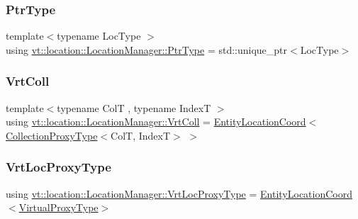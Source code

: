 \mbox{\label{structvt_1_1location_1_1_location_manager_a32d8bca6ed6909a2190286408335d3b4}} 
\subsubsection{\texorpdfstring{Ptr\+Type}{PtrType}}
{\footnotesize\ttfamily template$<$typename Loc\+Type $>$ \\
using \hyperlink{structvt_1_1location_1_1_location_manager_a32d8bca6ed6909a2190286408335d3b4}{vt\+::location\+::\+Location\+Manager\+::\+Ptr\+Type} =  std\+::unique\+\_\+ptr$<$Loc\+Type$>$}

\mbox{\label{structvt_1_1location_1_1_location_manager_a189fc3b436520c19aada9623a6b4a42e}} 
\subsubsection{\texorpdfstring{Vrt\+Coll}{VrtColl}}
{\footnotesize\ttfamily template$<$typename ColT , typename IndexT $>$ \\
using \hyperlink{structvt_1_1location_1_1_location_manager_a189fc3b436520c19aada9623a6b4a42e}{vt\+::location\+::\+Location\+Manager\+::\+Vrt\+Coll} =  \hyperlink{structvt_1_1location_1_1_entity_location_coord}{Entity\+Location\+Coord}$<$\hyperlink{structvt_1_1location_1_1_location_manager_add8d70c599ff0f03bc7a0d7eaed249d0}{Collection\+Proxy\+Type}$<$ColT, IndexT$>$ $>$}

\mbox{\label{structvt_1_1location_1_1_location_manager_a3e410c85f5790a526a4eda22a9cc7881}} 
\subsubsection{\texorpdfstring{Vrt\+Loc\+Proxy\+Type}{VrtLocProxyType}}
{\footnotesize\ttfamily using \hyperlink{structvt_1_1location_1_1_location_manager_a3e410c85f5790a526a4eda22a9cc7881}{vt\+::location\+::\+Location\+Manager\+::\+Vrt\+Loc\+Proxy\+Type} =  \hyperlink{structvt_1_1location_1_1_entity_location_coord}{Entity\+Location\+Coord}$<$\hyperlink{namespacevt_a1b417dd5d684f045bb58a0ede70045ac}{Virtual\+Proxy\+Type}$>$}

